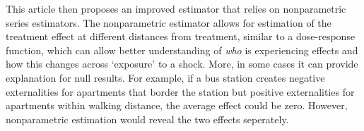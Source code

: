 This article then proposes an improved estimator that relies on nonparametric series estimators. The nonparametric estimator allows for estimation of the treatment effect at different distances from treatment, similar to a dose-response function, which can allow better understanding of \textit{who} is experiencing effects and how this changes across `exposure' to a shock. More, in some cases it can provide explanation for null results. For example, if a bus station creates negative externalities for apartments that border the station but positive externalities for apartments within walking distance, the average effect could be zero. However, nonparametric estimation would reveal the two effects seperately.
